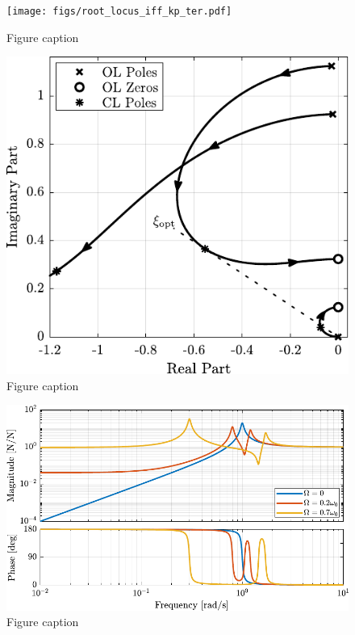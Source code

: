 \documentclass{ISMA_USD2020}
\begin{document}
\begin{figure}[htbp]
\centering
\texttt{[image: figs/root\_locus\_iff\_kp\_ter.pdf]}
\caption{\label{fig:root_locus_iff_kp_bis}Figure caption}
\end{figure}

\begin{figure}[htbp]
\centering
\includegraphics[scale=1]{figs/root_locus_opt_gain_iff_kp.pdf}
\caption{\label{fig:root_locus_opt_gain_iff_kp}Figure caption}
\end{figure}

\begin{figure}[htbp]
\centering
\includegraphics[scale=1]{figs/plant_iff_compare_rotating_speed.pdf}
\caption{\label{fig:plant_iff_compare_rotating_speed}Figure caption}
\end{figure}
\end{document}
